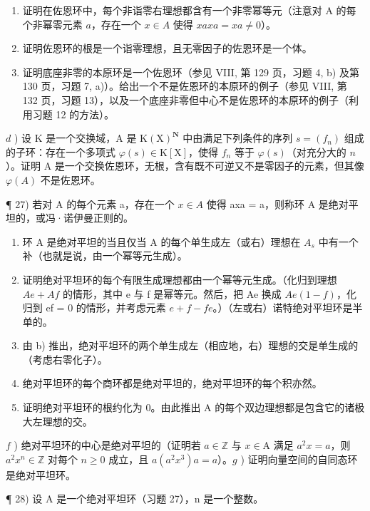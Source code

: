 \begin{enumerate}
\def\labelenumi{\alph{enumi})}
\item
  证明在佐恩环中，每个非诣零右理想都含有一个非零幂等元（注意对 A 的每个非幂零元素 \(a\)，存在一个 \(x \in A\) 使得 \(xaxa = xa \neq 0\)）。
\item
  证明佐恩环的根是一个诣零理想，且无零因子的佐恩环是一个体。
\item
  证明底座非零的本原环是一个佐恩环（参见 VIII, 第 129 页，习题 4, b) 及第 130 页，习题 7, a)）。给出一个不是佐恩环的本原环的例子（参见 VIII, 第 132 页，习题 13），以及一个底座非零但中心不是佐恩环的本原环的例子（利用习题 12 的方法）。
\end{enumerate}

\(d\) ) 设 K 是一个交换域，A 是 \(\mathrm{K}(\mathrm{X})^{\mathbf{N}}\) 中由满足下列条件的序列 \(s = (f_n)\) 组成的子环：存在一个多项式 \(\varphi(s) \in \mathrm{K}[\mathrm{X}]\)，使得 \(f_n\) 等于 \(\varphi(s)\)（对充分大的 \(n\)）。证明 A 是一个交换佐恩环，无根，含有既不可逆又不是零因子的元素，但其像 \(\varphi(A)\) 不是佐恩环。

¶ 27) 若对 A 的每个元素 a，存在一个 \(x \in A\) 使得 axa = a，则称环 A 是绝对平坦的，或冯·诺伊曼正则的。

\begin{enumerate}
\def\labelenumi{\alph{enumi})}
\item
  环 A 是绝对平坦的当且仅当 A 的每个单生成左（或右）理想在 \(A_{s}\) 中有一个补（也就是说，由一个幂等元生成）。
\item
  证明绝对平坦环的每个有限生成理想都由一个幂等元生成。（化归到理想 \(Ae + Af\) 的情形，其中 e 与 f 是幂等元。然后，把 Ae 换成 \(Ae(1 - f)\)，化归到 ef = 0 的情形，并考虑元素 \(e + f - fe\)。）（左或右）诺特绝对平坦环是半单的。
\item
  由 b) 推出，绝对平坦环的两个单生成左（相应地，右）理想的交是单生成的（考虑右零化子）。
\item
  绝对平坦环的每个商环都是绝对平坦的，绝对平坦环的每个积亦然。
\item
  证明绝对平坦环的根约化为 0。由此推出 A 的每个双边理想都是包含它的诸极大左理想的交。
\end{enumerate}

\(f\) ) 绝对平坦环的中心是绝对平坦的（证明若 \(a \in \mathbb{Z}\) 与 \(x \in \mathrm{A}\) 满足 \(a^2 x = a\)，则 \(a^2 x^n \in \mathbb{Z}\) 对每个 \(n \geqslant 0\) 成立，且 \(a(a^2 x^3)a = a\)）。\(g\) ) 证明向量空间的自同态环是绝对平坦环。

¶ 28) 设 A 是一个绝对平坦环（习题 27），n 是一个整数。

